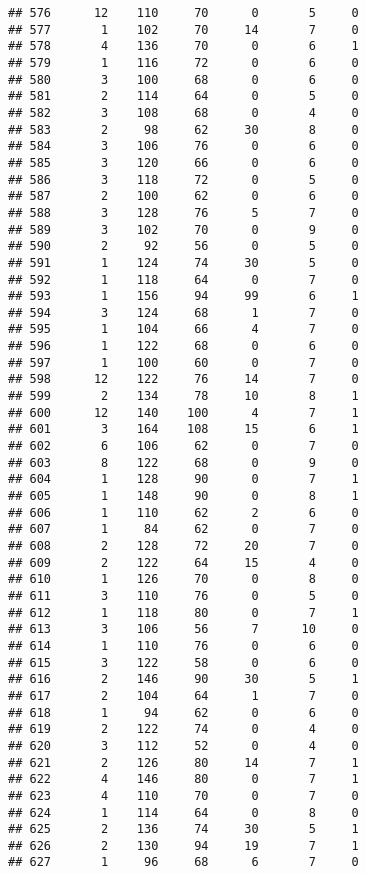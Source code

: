 \documentclass[
]{article}
\begin{document}
\begin{verbatim}
## 576      12    110     70      0       5     0
## 577       1    102     70     14       7     0
## 578       4    136     70      0       6     1
## 579       1    116     72      0       6     0
## 580       3    100     68      0       6     0
## 581       2    114     64      0       5     0
## 582       3    108     68      0       4     0
## 583       2     98     62     30       8     0
## 584       3    106     76      0       6     0
## 585       3    120     66      0       6     0
## 586       3    118     72      0       5     0
## 587       2    100     62      0       6     0
## 588       3    128     76      5       7     0
## 589       3    102     70      0       9     0
## 590       2     92     56      0       5     0
## 591       1    124     74     30       5     0
## 592       1    118     64      0       7     0
## 593       1    156     94     99       6     1
## 594       3    124     68      1       7     0
## 595       1    104     66      4       7     0
## 596       1    122     68      0       6     0
## 597       1    100     60      0       7     0
## 598      12    122     76     14       7     0
## 599       2    134     78     10       8     1
## 600      12    140    100      4       7     1
## 601       3    164    108     15       6     1
## 602       6    106     62      0       7     0
## 603       8    122     68      0       9     0
## 604       1    128     90      0       7     1
## 605       1    148     90      0       8     1
## 606       1    110     62      2       6     0
## 607       1     84     62      0       7     0
## 608       2    128     72     20       7     0
## 609       2    122     64     15       4     0
## 610       1    126     70      0       8     0
## 611       3    110     76      0       5     0
## 612       1    118     80      0       7     1
## 613       3    106     56      7      10     0
## 614       1    110     76      0       6     0
## 615       3    122     58      0       6     0
## 616       2    146     90     30       5     1
## 617       2    104     64      1       7     0
## 618       1     94     62      0       6     0
## 619       2    122     74      0       4     0
## 620       3    112     52      0       4     0
## 621       2    126     80     14       7     1
## 622       4    146     80      0       7     1
## 623       4    110     70      0       7     0
## 624       1    114     64      0       8     0
## 625       2    136     74     30       5     1
## 626       2    130     94     19       7     1
## 627       1     96     68      6       7     0

\end{verbatim}
\end{document}
